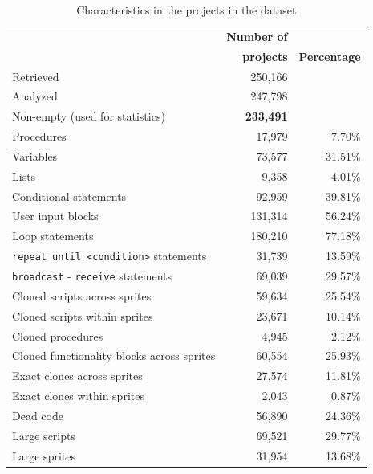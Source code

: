 \documentclass{sig-alternate}
\begin{document}
\begin{table}[ht]
	\centering
	\begin{tabular}{lrr}
		\hline
		&\textbf{Number of}&\\
		&\textbf{projects}&\textbf{Percentage}\\
		\hline
		Retrieved & 250,166 & \\
		Analyzed & 247,798 & \\
		Non-empty (used for statistics) & \textbf{233,491} & \\
		\hline
		Procedures & 17,979 & 7.70\%\\
		Variables & 73,577 & 31.51\% \\
		Lists & 9,358 & 4.01\% \\
		Conditional statements & 92,959 & 39.81\% \\
		User input blocks& 131,314 & 56.24\% \\
		Loop statements & 180,210 & 77.18\% \\
		\texttt{repeat until <condition>} statements & 31,739 & 13.59\% \\
		\texttt{broadcast} - \texttt{receive} statements & 69,039 & 29.57\%\\
		Cloned scripts across sprites & 59,634 & 25.54\% \\
		Cloned scripts within sprites & 23,671 & 10.14\%\\
		Cloned procedures & 4,945 & 2.12\%\\
		Cloned functionality blocks across sprites & 60,554 & 25.93\%\\
		Exact clones across sprites & 27,574 & 11.81\%\\
		Exact clones within sprites & 2,043 & 0.87\%\\
		Dead code & 56,890	& 24.36\%\\
		Large scripts & 69,521 & 29.77\%\\
		Large sprites & 31,954 & 13.68\%\\		
		\hline
	\end{tabular}
	\caption{Characteristics in the projects in the dataset}
	\label{tbl-characteristics}
\end{table}
\end{document}
